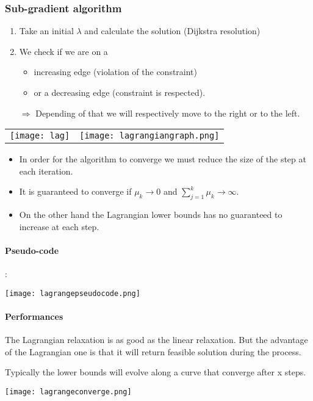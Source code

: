 \subsubsection{Sub-gradient algorithm}

\begin{enumerate}
    \item Take an initial $\lambda$ and calculate the solution (Dijkstra resolution)
    \item We check if we are on a 
        \begin{itemize}
            \item increasing edge (violation of the constraint) 
            \item or a decreasing edge (constraint is respected). 
        \end{itemize}

        $\Rightarrow$ Depending of that we will respectively move to
        the right or to the left.
\end{enumerate}

\begin{tabular}{m{9cm}m{9cm}}
    \texttt{[image: lag]}
    &
    \texttt{[image: lagrangiangraph.png]}
\end{tabular}


\begin{itemize}
    \item In order for the algorithm to converge we must reduce the size
        of the step at each iteration. 
    \item It is guaranteed to converge if $\mu_{k} \rightarrow 0$ and
        $\sum^{k}_{j=1} \mu_{k} \rightarrow \infty$.
    \item On the other hand the Lagrangian lower bounds has no
        guaranteed to increase at each step.
    \end{itemize}

\paragraph{Pseudo-code}:
\centerline{\texttt{[image: lagrangepseudocode.png]}}

\paragraph{Performances}

The Lagrangian relaxation is as good as the linear relaxation. But the
advantage of the Lagrangian one is that it will return feasible solution
during the process.

Typically the lower bounds will evolve along a curve that converge after x steps.

\centerline{\texttt{[image: lagrangeconverge.png]}}
